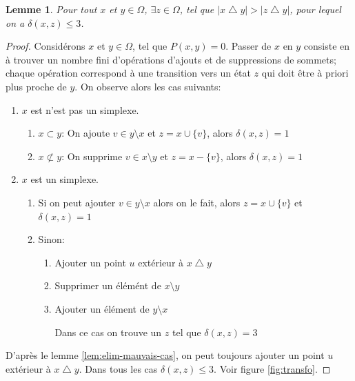 \documentclass[11pt]{article}
\newtheorem{lemme}{Lemme}[subsection]
\begin{document}
\begin{lemme}\label{prop:distance}
  Pour tout $x$ et $y \in \Omega$, $\exists z \in \Omega$, tel que $|x \bigtriangleup y| > |z \bigtriangleup y|$, pour lequel on a $\delta(x,z) \leq{3}$.
\end{lemme}

\begin{proof}
  Considérons $x$ et $y \in \Omega$, tel que $P(x,y) = 0$. Passer de $x$ en $y$ consiste en à trouver un nombre fini d'opérations d'ajouts et de suppressions de sommets; chaque opération correspond à une transition vers un état $z$ qui doit être à priori plus proche de $y$. On observe alors les cas suivants:

  \begin{enumerate}
    \item $x$ est n'est pas un simplexe.
    \begin{enumerate}
      \item $x \subset y$: On ajoute $v \in y \setminus x$ et $z = x \cup \{v\}$, alors $\delta(x,z) = 1$
      \item $x \not\subset y$: On supprime $v \in x \setminus y$ et $z = x - \{v\}$, alors $\delta(x,z) = 1$
    \end{enumerate}
    \item $x$ est un simplexe.
    \begin{enumerate}
      \item Si on peut ajouter $v \in y \setminus x$ alors on le fait, alors $z = x \cup \{v\}$ et $\delta(x,z) = 1$
      \item Sinon:
      \begin{enumerate}
        \item Ajouter un point $u$ extérieur à $x \bigtriangleup y$
        \item Supprimer un élémént de $x \setminus y$
        \item Ajouter un élément de $y \setminus x$

        Dans ce cas on trouve un $z$ tel que $\delta(x,z) = 3$
      \end{enumerate}
    \end{enumerate}
  \end{enumerate}

  D'après le lemme \ref{lem:elim-mauvais-cas}, on peut toujours ajouter un point $u$ extérieur à $x \bigtriangleup y$. Dans tous les cas $\delta(x,z) \leq{3}$. Voir figure \ref{fig:transfo}.





\end{proof}
\end{document}
